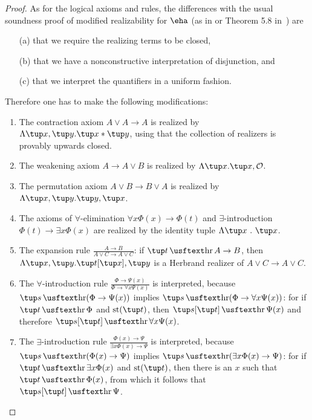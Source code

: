 \begin{proof}
As for the logical axioms and rules, the differences with the usual soundness proof of modified realizability for $\eha$ (as in \cite{Troelstra73} or Theorem 5.8 in~\cite{Kohlenbach08}) are
\begin{enumerate}
\item[(a)] that we require the realizing terms to be closed,
\item[(b)] that we have a nonconstructive interpretation of disjunction, and 
\item[(c)] that we interpret the quantifiers in a uniform fashion.
\end{enumerate}
Therefore one has to make the following modifications:
\begin{enumerate}
\item The contraction axiom $A \lor A \to A$ is realized by $\Lambda \tup x, \tup y. \tup x * \tup y$, using that the collection of realizers is provably upwards closed.
\item The weakening axiom $A \to A \lor B$ is realized by $\Lambda \tup x.\tup x, {\cal O}$.
\item The permutation axiom $A \lor B \to B \lor A$ is realized by $\Lambda \tup x, \tup y.\tup y, \tup x$.
\item The axioms of $\forall$-elimination $\forall x\Phi(x)\rightarrow\Phi(t)$ and $\exists$-introduction $\Phi(t)\rightarrow\exists x\Phi(x)$ are realized by the identity tuple $\Lambda \tup x\ .\ \tup x$.
\item The expansion rule $\frac{A \to B}{A \lor C \to A \lor C}$: if $\tup t \hr A \to B$, then $\Lambda \tup x, \tup y. \tup t[\tup x], \tup y$ is a Herbrand realizer of $A \lor C \to A \lor C$.
\item The $\forall$-introduction rule $\frac{\Phi\rightarrow\Psi(x)}{\Phi\rightarrow\forall x\Psi(x)}$ is interpreted, because $\tup s\hr (\Phi\rightarrow\Psi(x))$ implies $\tup s \hr  (\Phi\rightarrow\forall x\Psi(x))$: for if $\tup t \hr \Phi$ and $\st(\tup t)$, then $\tup s[\tup t]  \hr \Psi(x)$ and therefore $\tup s[ \tup t] \hr  \forall x\Psi(x)$.
\item The $\exists$-introduction rule $ \frac{\Phi(x)\rightarrow\Psi}{\exists x\Phi(x)\rightarrow\Psi}$ is interpreted, because $\tup s \hr (\Phi(x)\rightarrow\Psi)$ implies $\tup s \hr (\exists x\Phi(x)\rightarrow\Psi)$: for if $\tup t \hr \exists x\Phi(x)$ and $\st(\tup t)$, then there is an $x$ such that $ \tup t\hr \Phi(x)$, from which it follows that $\tup s[\tup t] \hr \Psi$. 
\end{enumerate}

\end{proof}
